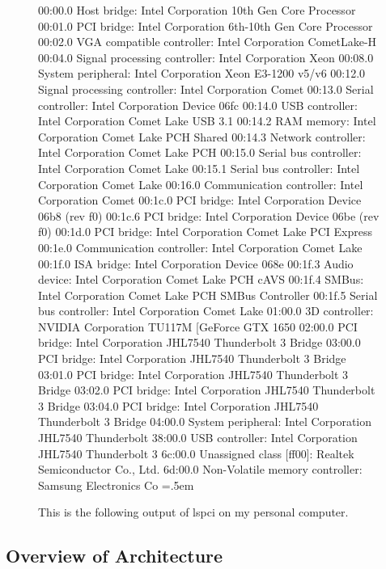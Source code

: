 \documentclass{article}
\newenvironment{cverbatim}
    {\SaveVerbatim{cverb}}
    {\endSaveVerbatim
    \flushleft\fboxrule=0pt\fboxsep=.5em
    \colorbox{cverbbg}{%
      \makebox[\dimexpr\linewidth-2\fboxsep][l]{\BUseVerbatim{cverb}}%
    }
    \endflushleft
  }
\begin{document}
      \begin{figure}[hbt!]
        \centering 
        \begin{cverbatim} 
00:00.0 Host bridge: Intel Corporation 10th Gen Core Processor 
00:01.0 PCI bridge: Intel Corporation 6th-10th Gen Core Processor 
00:02.0 VGA compatible controller: Intel Corporation CometLake-H 
00:04.0 Signal processing controller: Intel Corporation Xeon 
00:08.0 System peripheral: Intel Corporation Xeon E3-1200 v5/v6 
00:12.0 Signal processing controller: Intel Corporation Comet 
00:13.0 Serial controller: Intel Corporation Device 06fc
00:14.0 USB controller: Intel Corporation Comet Lake USB 3.1 
00:14.2 RAM memory: Intel Corporation Comet Lake PCH Shared 
00:14.3 Network controller: Intel Corporation Comet Lake PCH
00:15.0 Serial bus controller: Intel Corporation Comet Lake 
00:15.1 Serial bus controller: Intel Corporation Comet Lake 
00:16.0 Communication controller: Intel Corporation Comet 
00:1c.0 PCI bridge: Intel Corporation Device 06b8 (rev f0)
00:1c.6 PCI bridge: Intel Corporation Device 06be (rev f0)
00:1d.0 PCI bridge: Intel Corporation Comet Lake PCI Express
00:1e.0 Communication controller: Intel Corporation Comet Lake 
00:1f.0 ISA bridge: Intel Corporation Device 068e
00:1f.3 Audio device: Intel Corporation Comet Lake PCH cAVS
00:1f.4 SMBus: Intel Corporation Comet Lake PCH SMBus Controller
00:1f.5 Serial bus controller: Intel Corporation Comet Lake 
01:00.0 3D controller: NVIDIA Corporation TU117M [GeForce GTX 1650 
02:00.0 PCI bridge: Intel Corporation JHL7540 Thunderbolt 3 Bridge
03:00.0 PCI bridge: Intel Corporation JHL7540 Thunderbolt 3 Bridge
03:01.0 PCI bridge: Intel Corporation JHL7540 Thunderbolt 3 Bridge
03:02.0 PCI bridge: Intel Corporation JHL7540 Thunderbolt 3 Bridge
03:04.0 PCI bridge: Intel Corporation JHL7540 Thunderbolt 3 Bridge
04:00.0 System peripheral: Intel Corporation JHL7540 Thunderbolt 
38:00.0 USB controller: Intel Corporation JHL7540 Thunderbolt 3 
6c:00.0 Unassigned class [ff00]: Realtek Semiconductor Co., Ltd. 
6d:00.0 Non-Volatile memory controller: Samsung Electronics Co 
        \end{cverbatim}
        \caption{This is the following output of lspci on my personal computer. } 
        \label{fig:}
      \end{figure}

  \subsection{Overview of Architecture} 
\end{document}
